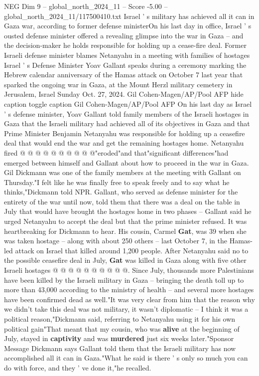 \begin{textsample}{NEG Dim 9 – global\_north\_2024\_11 – Score -5.00 – global\_north\_2024\_11/117500410.txt}  \label{ex:f9_neg_206}
Israel ' s military has achieved all it can in Gaza war, according to former defense ministerOn his last day in office, Israel ' s ousted defense minister offered a revealing glimpse into the war in Gaza -- and the decision-maker he holds responsible for holding up a cease-fire deal.
Former Israeli defense minister blames Netanyahu in a meeting with families of hostages Israel ' s Defense Minister Yoav Gallant speaks during a ceremony marking the Hebrew calendar anniversary of the Hamas attack on October 7 last year that sparked the ongoing war in Gaza, at the Mount Herzl military cemetery in Jerusalem, Israel Sunday Oct. 27, 2024.
Gil Cohen-Magen/AP/Pool AFP hide caption toggle caption Gil Cohen-Magen/AP/Pool AFP On his last day as Israel ' s defense minister, Yoav Gallant told family members of the Israeli hostages in Gaza that the Israeli military had achieved all of its objectives in Gaza and that Prime Minister Benjamin Netanyahu was responsible for holding up a ceasefire deal that would end the war and get the remaining hostages home.
Netanyahu fired @ @ @ @ @ @ @ @ @ @"eroded"and that"significant differences"had emerged between himself and Gallant about how to proceed in the war in Gaza.
Gil Dickmann was one of the family members at the meeting with Gallant on Thursday."I felt like he was finally free to speak freely and to say what he thinks,"Dickmann told NPR.
Gallant, who served as defense minister for the entirety of the war until now, told them that there was a deal on the table in July that would have brought the hostages home in two phases -- Gallant said he urged Netanyahu to accept the deal but that the prime minister refused.
It was heartbreaking for Dickmann to hear.
His cousin, Carmel \textbf{Gat}, was 39 when she was taken hostage -- along with about 250 others -- last October 7, in the Hamas-led attack on Israel that killed around 1,200 people.
After Netanyahu said no to the possible ceasefire deal in July, \textbf{Gat} was killed in Gaza along with five other Israeli hostages @ @ @ @ @ @ @ @ @ @.
Since July, thousands more Palestinians have been killed by the Israeli military in Gaza -- bringing the death toll up to more than 43,000 according to the ministry of health -- and several more hostages have been confirmed dead as well."It was very clear from him that the reason why we didn't take this deal was not military, it wasn't diplomatic -- I think it was a political reason,"Dickmann said, referring to Netanyahu using it for his own political gain"That meant that my cousin, who was \textbf{alive} at the beginning of July, stayed in \textbf{captivity} and was \textbf{murdered} just six weeks later."Sponsor Message Dickmann says Gallant told them that the Israeli military has now accomplished all it can in Gaza."What he said is there ' s only so much you can do with force, and they ' ve done it,"he recalled.

\end{textsample}
